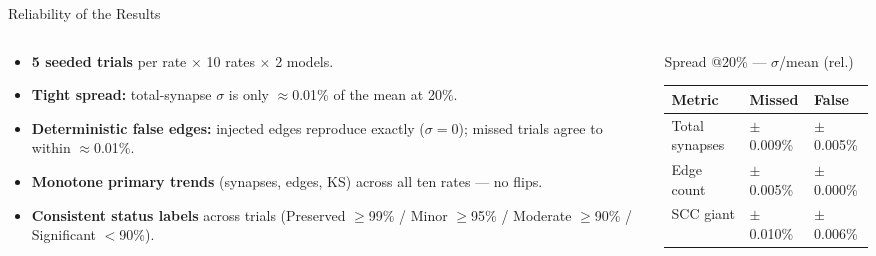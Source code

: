 \documentclass[aspectratio=169,11pt]{beamer}
\begin{document}
\begin{frame}{Reliability of the Results}
\begin{columns}[T]
  \begin{column}{0.55\textwidth}
    \footnotesize
    \begin{itemize}
      \item \textbf{5 seeded trials} per rate $\times$ 10 rates $\times$ 2
            models.
      \item \textbf{Tight spread:} total-synapse $\sigma$ is only
            $\approx$0.01\% of the mean at 20\%.
      \item \textbf{Deterministic false edges:} injected edges reproduce
            exactly ($\sigma = 0$); missed trials agree to within
            $\approx$0.01\%.
      \item \textbf{Monotone primary trends} (synapses, edges, KS) across all
            ten rates --- no flips.
      \item \textbf{Consistent status labels} across trials
            (Preserved $\ge$99\% / Minor $\ge$95\% / Moderate $\ge$90\% /
            Significant $<$90\%).
    \end{itemize}
  \end{column}
  \begin{column}{0.43\textwidth}
    \begin{block}{Spread @20\% --- $\sigma$/mean (rel.)}
      \renewcommand{\arraystretch}{1.4}
      \begin{tabular}{@{}lll@{}}
        \toprule
        \textbf{Metric} & \textbf{Missed} & \textbf{False}\\
        \midrule
        Total synapses & $\pm$0.009\% & $\pm$0.005\%\\
        Edge count & $\pm$0.005\% & $\pm$0.000\%\\
        SCC giant & $\pm$0.010\% & $\pm$0.006\%\\
        \bottomrule
      \end{tabular}
    \end{block}
  \end{column}
\end{columns}
\end{frame}
\end{document}
